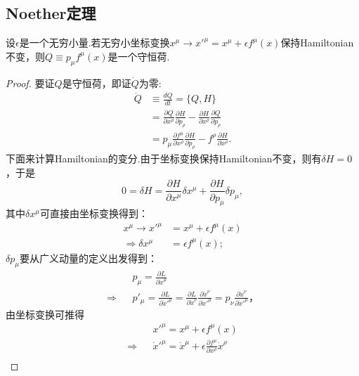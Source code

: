 \documentclass[10pt]{article}
\begin{document}
\subsection{Noether定理}
	\begin{theorem}
	设$\epsilon$是一个无穷小量.若无穷小坐标变换$x^\mu\rightarrow x'^\mu=x^\mu+\epsilon f^\mu(x)$保持Hamiltonian不变，则$Q\equiv p_\mu f^\mu(x)$是一个守恒荷.
	\end{theorem}
	\begin{proof}
	要证$Q$是守恒荷，即证$\dot{Q}$为零:
	\begin{equation*}
		\begin{split}
			\dot{Q}&\equiv\frac{dQ}{dt}=\{Q,H\}\\
			&=\frac{\partial Q}{\partial x^\rho}\frac{\partial H}{\partial p_\rho}-\frac{\partial H}{\partial x^\rho}\frac{\partial Q}{\partial p_\rho}\\
			&=p_\mu \frac{\partial f^\mu}{\partial x^\rho}\frac{\partial H}{\partial p_\rho}-f^\rho\frac{\partial H}{\partial x^\rho}.
		\end{split}
	\end{equation*}
	下面来计算Hamiltonian的变分.由于坐标变换保持Hamiltonian不变，则有$\delta H=0$，于是
	\begin{equation}\label{pr:delta H}
		0=\delta H=\frac{\partial H}{\partial x^\mu}\delta x^\mu+\frac{\partial H}{\partial p_\mu}\delta p_\mu,
	\end{equation}
	其中$\delta x^\mu$可直接由坐标变换得到：
	\begin{equation}\label{pr:delta x}
		\begin{split}
			x^\mu\rightarrow x'^\mu&=x^\mu+\epsilon f^\mu(x)\\
			\Rightarrow\delta x^\mu&=\epsilon f^\mu(x);
		\end{split}
	\end{equation}
	$\delta p_\mu$要从广义动量的定义出发得到：
	\begin{eqnarray*}
		&&p_\mu=\frac{\partial L}{\partial \dot{x}^\mu}\\
		\Rightarrow &&p'_\mu=\frac{\partial L}{\partial \dot{x}'^\mu}=\frac{\partial L}{\partial \dot{x}^\nu}\frac{\partial \dot{x}^\nu}{\partial \dot{x}'^\mu}=p_\nu\frac{\partial \dot{x}^\nu}{\partial \dot{x}'^\mu}，
	\end{eqnarray*}
	由坐标变换可推得
	\begin{eqnarray*}
		&&x'^\mu=x^\mu+\epsilon f^\mu(x)\\
		\Rightarrow&&\dot{x}'^\mu=\dot{x}^\mu+\epsilon \frac{\partial f^\mu}{\partial x^\rho}\dot{x}^\rho\\

\end{eqnarray*}
\end{proof}
\end{document}
